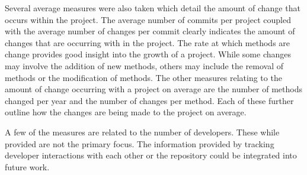 Several average measures were also taken which detail the amount of change that occurs within the project. The average number of commits per project coupled with the average number of changes per commit clearly indicates the amount of changes that are occurring with in the project. The rate at which methods are change provides good insight into the growth of a project. While some changes may involve the addition of new methods, others may include the removal of methods or the modification of methods. The other measures relating to the amount of change occurring with a project on average are the number of methods changed per year and the number of changes per method. Each of these further outline how the changes are being made to the project on average.

A few of the measures are related to the number of developers. These while provided are not the primary focus. The information provided by tracking developer interactions with each other or the repository could be integrated into future work.


